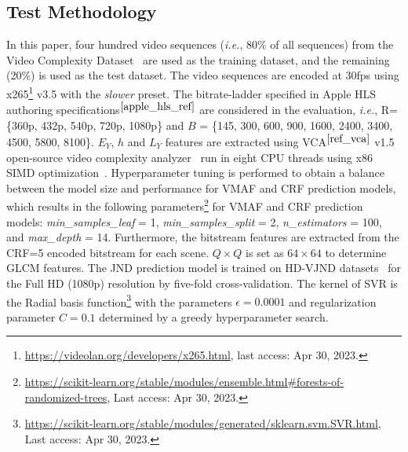 \documentclass{article}
\newcommand{\ie}{\emph{i.e.}, }
\begin{document}
\subsection{Test Methodology}
\label{sec:test_methodology}
\vspace{-0.3em}
In this paper, four hundred video sequences (\ie 80\% of all sequences) from the Video Complexity Dataset~\cite{VCD_ref} are used as the training dataset, and the remaining (20\%) is used as the test dataset. The video sequences are encoded at 30fps using x265\footnote{\label{ref_x265}\href{https://videolan.org/developers/x265.html}{https://videolan.org/developers/x265.html}, last access: Apr 30, 2023.} v3.5 with the \textit{slower} preset. The bitrate-ladder specified in Apple HLS authoring specifications$^{\ref{apple_hls_ref}}$ are considered in the evaluation, \ie R= \{360p, 432p, 540p, 720p, 1080p\} and $B$ = \{145, 300, 600, 900, 1600, 2400, 3400, 4500, 5800, 8100\}. $E_Y$, $h$ and $L_Y$ features are extracted using VCA$^{\ref{ref_vca}}$ v1.5 open-source video complexity analyzer~\cite{vca_ref} run in eight CPU threads using x86 SIMD optimization~\cite{x86_simd_ref}. Hyperparameter tuning is performed to obtain a balance between the model size and performance for VMAF and CRF prediction models, which results in the following parameters\footnote{\href{https://scikit-learn.org/stable/modules/ensemble.html\#forests-of-randomized-trees}{https://scikit-learn.org/stable/modules/ensemble.html\#forests-of-randomized-trees}, Last access: Apr 30, 2023.} for VMAF and CRF prediction models: \textit{min\_samples\_leaf} = 1, \textit{min\_samples\_split} = 2, \textit{n\_estimators} = 100, and \textit{max\_depth} = 14.
Furthermore, the bitstream features are extracted from the CRF=5 encoded bitstream for each scene. $Q\times Q$ is set as $64\times64$ to determine GLCM features. The JND prediction model is trained on HD-VJND datasets~\cite{zhu2022subjective} for the Full HD (1080p) resolution by five-fold cross-validation. The kernel of SVR is the Radial basis function\footnote{\href{https://scikit-learn.org/stable/modules/generated/sklearn.svm.SVR.html}{https://scikit-learn.org/stable/modules/generated/sklearn.svm.SVR.html}, Last access: Apr 30, 2023.} with the parameters $\epsilon=0.0001$ and regularization parameter $C=0.1$ determined by a greedy hyperparameter search.
\end{document}
